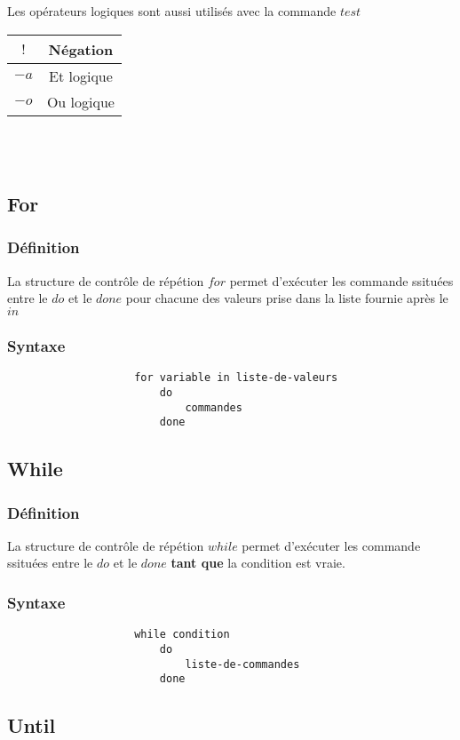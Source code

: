 				Les opérateurs logiques sont aussi utilisés avec la commande $test$\\
				\begin{tabular}{|c|c|}
					\hline 
						$!$  & Négation\\ 
					\hline 
					\hline 
						$-a$  & Et logique\\ 
					\hline 
					\hline 
						$-o$  & Ou logique\\ 
					\hline 
				\end{tabular}\\ \\
		\subsection{For}
			\subsubsection{Définition}
				La structure de contrôle de répétion $for$ permet d'exécuter les commande ssituées entre le $do$ et le $done$ pour chacune des valeurs prise dans la liste fournie après le $in$ 
			\subsubsection{Syntaxe}
				\begin{verbatim}
					for variable in liste-de-valeurs 
					    do
					        commandes
					    done
				\end{verbatim}
		\subsection{While}
			\subsubsection{Définition}
				La structure de contrôle de répétion $while$ permet d'exécuter les commande ssituées entre le $do$ et le $done$ \textbf{tant que} la condition est vraie.
			\subsubsection{Syntaxe}
				\begin{verbatim}
					while condition
					    do
					        liste-de-commandes
					    done
				\end{verbatim}
		\subsection{Until}
